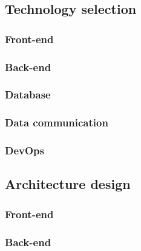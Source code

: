 \documentclass{article}
\begin{document}
    \subsection{Technology selection}
    

            \subsubsection{Front-end}
            
            
            \subsubsection{Back-end}
            
            
            \subsubsection{Database}
            
            
            \subsubsection{Data communication}
            
            
            \subsubsection{DevOps}
            

    \subsection{Architecture design} %
    

        \subsubsection{Front-end}
        

        \subsubsection{Back-end}
        
\end{document}
